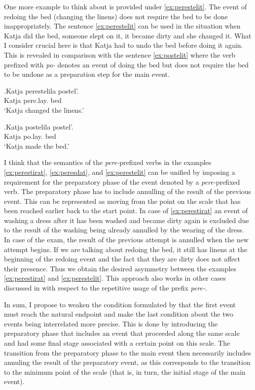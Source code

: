 One more example to think about is provided under \ref{ex:perestelit}. The event of redoing the bed (changing the linens) does not require the bed to be done inappropriately. The sentence \ref{ex:perestelit} can be used in the situation when Katja did the bed, someone slept on it, it became dirty and she changed it. What I consider crucial here is that Katja had to undo the bed before doing it again. This is revealed in comparison with the sentence \ref{ex:postelit} where the verb prefixed with \textit{po-} denotes an event of doing the bed but does not require the bed to be undone as a preparation step for the main event. 

\exg.\label{ex:perestelit}Katja perestelila postel'.\\
Katja pere.lay. bed\\
\vspace{0.5em}
`Katja changed the linens.'

\exg.\label{ex:postelit}Katja postelila postel'.\\
Katja po.lay. bed\\
\vspace{0.5em}
`Katja made the bed.'

I think that the semantics of the \textit{pere-}prefixed verbs in the examples \ref{ex:perestirat}, \ref{ex:peresdat}, and \ref{ex:perestelit} can be unified by imposing a requirement for the preparatory phase of the event denoted by a \textit{pere-}prefixed verb. The preparatory phase has to include annulling of the result of the previous event. This can be represented as moving from the point on the scale that has been reached earlier back to the start point. In case of \ref{ex:perestirat} an event of washing a dress after it has been washed and became dirty again is excluded due to the result of the washing being already annulled by the wearing of the dress. In case of the exam, the result of the previous attempt is annulled when the new attempt begins. If we are talking about redoing the bed, it still has linens at the beginning of the redoing event and the fact that they are dirty does not affect their presence. Thus we obtain the desired asymmetry between the examples \ref{ex:perestirat} and \ref{ex:perestelit}. This approach also works in other cases discussed in \citealt{Kagan:book} with respect to the repetitive usage of the prefix \textit{pere-}.

In sum, I propose to weaken the condition formulated by \citet{Kagan:book} that the first event must reach the natural endpoint and make the last condition about the two events being interrelated more precise. This is done by introducing the preparatory phase that includes an event that proceeded along the same scale and had some final stage associated with a certain point on this scale. The transition from the preparatory phase to the main event then necessarily includes annuling the result of the preparatory event, as this corresponds to the transition to the minimum point of the scale (that is, in turn, the initial stage of the main event).

